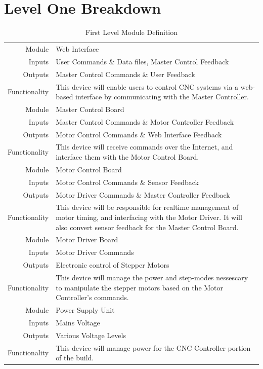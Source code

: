 \section{Level One Breakdown}
\begin{table}[H] 
	\caption{First Level Module Definition}
	\label{table:firstlevel}
	\centering 
	\begin{tabular}{|r p{10cm}|} 
		\hline\hline 
		Module		& Web Interface \\ 
		Inputs		& User Commands \& Data files, Master Control Feedback	\\ 
		Outputs		& Master Control Commands \& User Feedback \\ 
		Functionality	& This device will enable users to control CNC systems via a web-based interface by communicating with the Master Controller.\\ 
		\hline\hline 
		Module		& Master Control Board \\ 
		Inputs		& Master Control Commands \& Motor Controller Feedback	\\ 
		Outputs		& Motor Control Commands \& Web Interface Feedback \\ 
		Functionality	& This device will receive commands over the Internet, and interface them with the Motor Control Board. \\
		\hline\hline 
		Module		& Motor Control Board \\ 
		Inputs		& Motor Control Commands \& Sensor Feedback	\\ 
		Outputs		& Motor Driver Commands \& Master Controller Feedback \\ 
		Functionality	& This device will be responsible for realtime management of motor timing, and interfacing with the Motor Driver. It will also convert sensor feedback for the Master Control Board.\\
		\hline\hline 
		Module		& Motor Driver Board \\ 
		Inputs		& Motor Driver Commands \\ 
		Outputs		& Electronic control of Stepper Motors \\ 
		Functionality	& This device will manage the power and step-modes nessescary to manipulate the stepper motors based on the Motor Controller's commands. \\
		\hline\hline 
		Module		& Power Supply Unit \\ 
		Inputs		& Mains Voltage	\\ 
		Outputs		& Various Voltage Levels \\ 
		Functionality	& This device will manage power for the CNC Controller portion of the build. \\
		\hline
		\end{tabular} 
\end{table}

